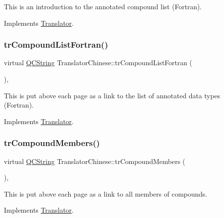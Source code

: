 This is an introduction to the annotated compound list (Fortran). 

Implements \mbox{\hyperlink{class_translator}{Translator}}.

\mbox{\label{class_translator_chinese_a0feb78d3ef47ad9e2685d100ef514fbf}} 
\subsubsection{\texorpdfstring{trCompoundListFortran()}{trCompoundListFortran()}}
{\footnotesize\ttfamily virtual \mbox{\hyperlink{class_q_c_string}{Q\+C\+String}} Translator\+Chinese\+::tr\+Compound\+List\+Fortran (\begin{DoxyParamCaption}{ }\end{DoxyParamCaption})\hspace{0.3cm}{\ttfamily [inline]}, {\ttfamily [virtual]}}

This is put above each page as a link to the list of annotated data types (Fortran). 

Implements \mbox{\hyperlink{class_translator}{Translator}}.

\mbox{\label{class_translator_chinese_a8676dac1d6a58f11fc47f6a177910650}} 
\subsubsection{\texorpdfstring{trCompoundMembers()}{trCompoundMembers()}}
{\footnotesize\ttfamily virtual \mbox{\hyperlink{class_q_c_string}{Q\+C\+String}} Translator\+Chinese\+::tr\+Compound\+Members (\begin{DoxyParamCaption}{ }\end{DoxyParamCaption})\hspace{0.3cm}{\ttfamily [inline]}, {\ttfamily [virtual]}}

This is put above each page as a link to all members of compounds. 

Implements \mbox{\hyperlink{class_translator}{Translator}}.

\mbox{\label{class_translator_chinese_ae8cdfdaeb6152a65560045241010cf51}} 
